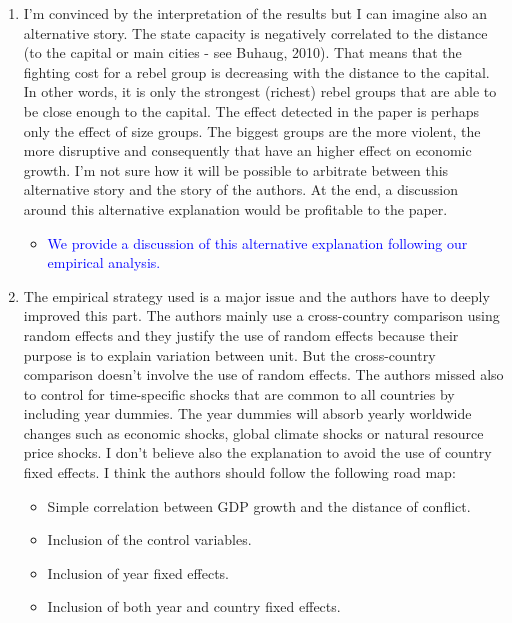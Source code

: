 \begin{enumerate}

\item  I’m convinced by the interpretation of the results but I can imagine also an alternative story. The state capacity is negatively correlated to the distance (to the capital or main cities - see Buhaug, 2010). That means that the fighting cost for a rebel group is decreasing with the distance to the capital. In other words, it is only the strongest (richest) rebel groups that are able to be close enough to the capital. The effect detected in the paper is perhaps only the effect of size groups. The biggest groups are the more violent, the more disruptive and consequently that have an higher effect on economic growth. I’m not sure how it will be possible to arbitrate between this alternative story and the story of the authors. At the end, a discussion around this alternative explanation would be profitable to the paper.

\begin{itemize}
\item \textcolor{blue}{
	We provide a discussion of this alternative explanation following our empirical analysis.
}
\end{itemize}

\item The empirical strategy used is a major issue and the authors have to deeply improved this part. The authors mainly use a cross-country comparison using random effects and they justify the use of random effects because their purpose is to explain variation between unit. But the cross-country comparison doesn’t involve the use of random effects. The authors missed also to control for time-specific shocks that are common to all countries by including year dummies. The year dummies will absorb yearly worldwide changes such as economic shocks, global climate shocks or natural resource price shocks. I don’t believe also the explanation to avoid the use of country fixed effects. I think the authors should follow the following road map:
\begin{itemize}
\item Simple correlation between GDP growth and the distance of conflict.
\item Inclusion of the control variables.
\item Inclusion of year fixed effects.
\item Inclusion of both year and country fixed effects.
\end{itemize}


\end{enumerate}
